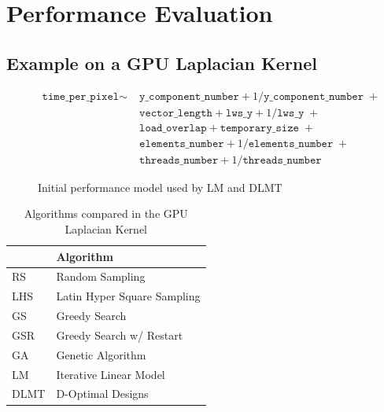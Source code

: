 \documentclass[conference]{IEEEtran}
\begin{document}
\section{Performance Evaluation}
\label{sec:orgbf6a4a1}
\subsection{Example on a GPU Laplacian Kernel}
\label{sec:org9cc1814}
\begin{figure}
{\scriptsize
\begin{align*}
\texttt{time\_per\_pixel} \sim & \; \texttt{y\_component\_number} + 1 / \texttt{y\_component\_number} \; + \\
& \; \texttt{vector\_length} + \texttt{lws\_y} + 1 / \texttt{lws\_y} \; + \\
& \; \texttt{load\_overlap} + \texttt{temporary\_size} \; + \\
& \; \texttt{elements\_number} + 1 / \texttt{elements\_number} \; + \\
& \; \texttt{threads\_number} + 1 /\texttt{threads\_number}
\end{align*}
}
\caption{Initial performance model used by LM and DLMT}
\end{figure}

\begin{table}[ht]
\caption{Algorithms compared in the GPU Laplacian Kernel}
\centering
\footnotesize
\begin{tabular}{ll}
\toprule
 & Algorithm\\
\midrule
RS & Random Sampling\\
LHS & Latin Hyper Square Sampling\\
GS & Greedy Search\\
GSR & Greedy Search w/ Restart\\
GA & Genetic Algorithm\\
LM & Iterative Linear Model\\
DLMT & D-Optimal Designs\\
\bottomrule
\end{tabular}
\end{table}
\end{document}
